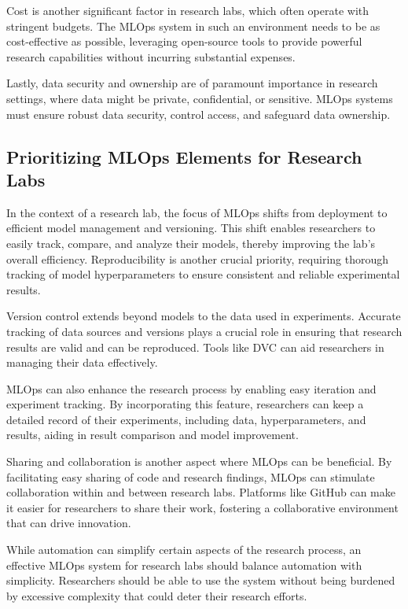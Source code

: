 Cost is another significant factor in research labs, which often operate with stringent budgets. The MLOps system in such an environment needs to be as cost-effective as possible, leveraging open-source tools to provide powerful research capabilities without incurring substantial expenses.

Lastly, data security and ownership are of paramount importance in research settings, where data might be private, confidential, or sensitive. MLOps systems must ensure robust data security, control access, and safeguard data ownership.

\subsection{Prioritizing MLOps Elements for Research Labs
 \label{prioritizing-mlops}}

In the context of a research lab, the focus of MLOps shifts from deployment to efficient model management and versioning. This shift enables researchers to easily track, compare, and analyze their models, thereby improving the lab's overall efficiency. Reproducibility is another crucial priority, requiring thorough tracking of model hyperparameters to ensure consistent and reliable experimental results.

Version control extends beyond models to the data used in experiments. Accurate tracking of data sources and versions plays a crucial role in ensuring that research results are valid and can be reproduced. Tools like DVC can aid researchers in managing their data effectively.

MLOps can also enhance the research process by enabling easy iteration and experiment tracking. By incorporating this feature, researchers can keep a detailed record of their experiments, including data, hyperparameters, and results, aiding in result comparison and model improvement.

Sharing and collaboration is another aspect where MLOps can be beneficial. By facilitating easy sharing of code and research findings, MLOps can stimulate collaboration within and between research labs. Platforms like GitHub can make it easier for researchers to share their work, fostering a collaborative environment that can drive innovation.

While automation can simplify certain aspects of the research process, an effective MLOps system for research labs should balance automation with simplicity. Researchers should be able to use the system without being burdened by excessive complexity that could deter their research efforts.

